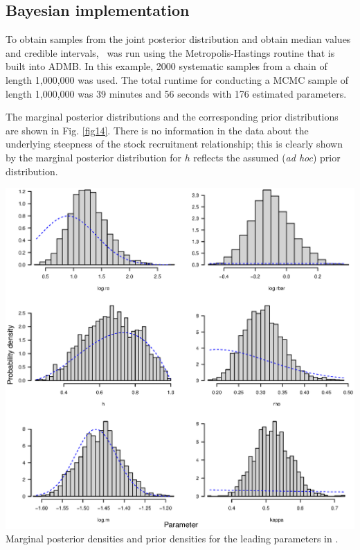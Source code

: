 \begin{multicols}{2}
\subsection{Bayesian implementation}
To obtain samples from the joint posterior distribution and obtain median values and credible intervals, \iscam\ was run using the Metropolis-Hastings routine that is built into ADMB.  In this example, 2000 systematic samples from a chain of length 1,000,000 was used.  The total runtime for conducting a MCMC sample  of length 1,000,000 was 39 minutes and 56 seconds with 176 estimated parameters.

The marginal posterior distributions and the corresponding prior distributions are shown in Fig. \ref{fig14}.  There is no information in the data about the underlying steepness of the stock recruitment relationship; this is clearly shown by the marginal posterior distribution for $h$ reflects the assumed (\emph{ad hoc}) prior distribution.

\begin{figurehere}
	\centering
	\includegraphics[width=0.9\columnwidth]{iscamFigs/phakefig5.eps}\\
	\caption{Marginal posterior densities and prior densities for the leading parameters in \iscam.}\label{fig14}
\end{figurehere}


\end{multicols}
